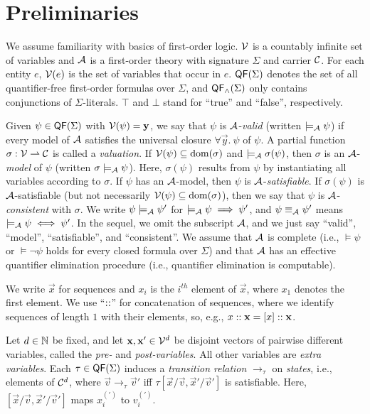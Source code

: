 \section{Preliminaries}
\label{sec:preliminaries}

We assume familiarity with basics of first-order logic\cite{enderton}.
%
$\VV$ is a countably infinite set of variables and $\AA$ is a first-order theory with signature $\Sigma$ and carrier $\CC$.
%
For each entity $e$, $\VV(e)$ is the set of variables that occur in $e$.
%
$\QF(\Sigma)$ denotes the set of all quantifier-free first-order formulas over $\Sigma$, and $\QF_\land(\Sigma)$ only contains conjunctions of $\Sigma$-literals.
%
$\top$ and $\bot$ stand for ``true'' and ``false'', respectively.

Given $\psi \in \QF(\Sigma)$ with $\VV(\psi) = \vec{y}$, we say that $\psi$ is $\AA$-\emph{valid} (written $\models_\AA \psi$) if every model of $\AA$ satisfies the universal closure $\forall \vec{y}.\ \psi$ of $\psi$.
%
A partial function $\sigma: \VV \partial \CC$ is called a \emph{valuation}.
%
If $\VV(\psi) \subseteq \dom(\sigma)$ and $\models_\AA \sigma(\psi)$, then $\sigma$ is an $\AA$-\emph{model} of $\psi$ (written $\sigma \models_\AA \psi$).
%
Here, $\sigma(\psi)$ results from $\psi$ by instantiating all variables according to $\sigma$.
%
If $\psi$ has an $\AA$-model, then $\psi$ is $\AA$-\emph{satisfiable}.
%
If $\sigma(\psi)$ is $\AA$-satisfiable (but not necessarily $\VV(\psi) \subseteq \dom(\sigma)$), then we say that $\psi$ is $\AA$-\emph{consistent} with $\sigma$.
%
We write $\psi \models_\AA \psi'$ for $\models_\AA \psi \implies \psi'$, and $\psi \equiv_\AA \psi'$ means $\models_\AA \psi \iff \psi'$.
%
In the sequel, we omit the subscript $\AA$, and we just say ``valid'', ``model'', ``satisfiable'', and ``consistent''.
%
We assume that $\AA$ is complete (i.e., $\models \psi$ or $\models \neg \psi$ holds for every closed formula over $\Sigma$) and that $\AA$ has an effective quantifier elimination procedure (i.e., quantifier elimination is computable).

We write $\vec{x}$ for sequences and $x_i$ is the $i^{th}$ element of $\vec{x}$, where $x_1$ denotes the first element.
%
We use ``$\concat$'' for concatenation of sequences, where we identify sequences of length $1$ with their elements, so, e.g., $x\concat\vec{x} = [x]\concat\vec{x}$.

Let $d \in \NN$ be fixed, and let $\vec{x},\vec{x}' \in \VV^d$ be disjoint vectors of pairwise different variables, called the \emph{pre-} and \emph{post-variables}.
%
All other variables are \emph{extra variables}.
%
Each $\tau \in \QF(\Sigma)$ induces a \emph{transition relation} $\to_\tau$ on \emph{states}, i.e., elements of $\CC^d$, where $\vec{v} \to_\tau \vec{v}'$ iff $\tau[\vec{x}/\vec{v},\vec{x}'/\vec{v}']$ is satisfiable.
%
Here, $[\vec{x}/\vec{v},\vec{x}'/\vec{v}']$ maps
$x^{(\prime)}_i$ to $v^{(\prime)}_i$.


